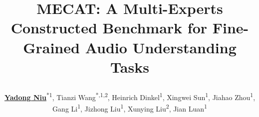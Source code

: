 


\renewcommand{\PosterTitleLeftWidth}{0.16\linewidth}
\renewcommand{\PosterTitleCenterWidth}{0.62\linewidth}
\renewcommand{\PosterTitleRightWidth}{0.08\linewidth}

\graphicspath{{assets/}}
\title{\parbox{\linewidth}{\centering MECAT: A Multi-Experts Constructed Benchmark for Fine-Grained Audio Understanding Tasks}}
\author{\underline{\textbf{Yadong Niu}}\textsuperscript{*1},
    Tianzi Wang\textsuperscript{*,1,2},
    Heinrich Dinkel\textsuperscript{1},
    Xingwei Sun\textsuperscript{1},
    Jiahao Zhou\textsuperscript{1},
    Gang Li\textsuperscript{1},
    Jizhong Liu\textsuperscript{1},
    Xunying Liu\textsuperscript{2},
    Jian Luan\textsuperscript{1}}
\titlegraphicleft{\PosterLeftLogo}
\titlegraphic{\PosterRightLogo}

\newcommand{\PosterRepositoryUrl}{https://github.com/xiaomi-research/mecat}
\newcommand{\PosterRepositoryText}{github.com/xiaomi-research/mecat}
